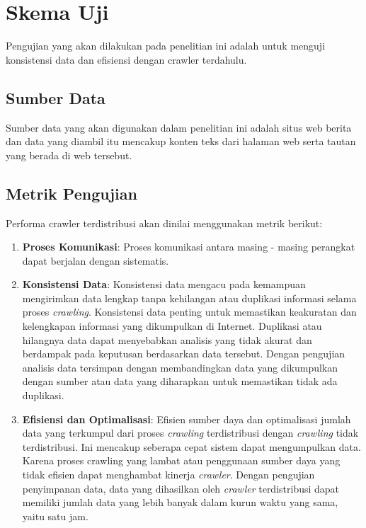 \section{Skema Uji}

Pengujian yang akan dilakukan pada penelitian ini adalah untuk menguji konsistensi data dan efisiensi dengan crawler terdahulu.

\subsection{Sumber Data}

Sumber data yang akan digunakan dalam penelitian ini adalah situs web berita dan data yang diambil itu mencakup konten teks dari halaman web serta tautan yang berada di web tersebut.

\subsection{Metrik Pengujian}

Performa crawler terdistribusi akan dinilai menggunakan metrik berikut:
\begin{enumerate}
  \item{\textbf{Proses Komunikasi}: Proses komunikasi antara masing - masing perangkat dapat berjalan dengan sistematis.}

  \item{\textbf{Konsistensi Data}: Konsistensi data mengacu pada kemampuan mengirimkan data lengkap tanpa kehilangan atau duplikasi informasi  selama proses \emph{crawling}. Konsistensi data penting untuk memastikan keakuratan dan kelengkapan informasi yang dikumpulkan di Internet. Duplikasi atau hilangnya data dapat menyebabkan analisis yang tidak akurat dan berdampak pada keputusan berdasarkan data tersebut. Dengan pengujian analisis data tersimpan dengan membandingkan data yang dikumpulkan dengan sumber atau data yang diharapkan untuk memastikan tidak ada duplikasi.}
    
  \item{\textbf{Efisiensi dan Optimalisasi}: Efisien sumber daya dan optimalisasi jumlah data yang terkumpul dari proses \emph{crawling} terdistribusi dengan \emph{crawling} tidak terdistribusi. Ini mencakup seberapa cepat sistem dapat mengumpulkan data. Karena proses crawling yang lambat atau penggunaan sumber daya yang tidak efisien dapat menghambat kinerja \emph{crawler}. Dengan pengujian penyimpanan data, data yang dihasilkan oleh \emph{crawler} terdistribusi dapat memiliki jumlah data yang lebih banyak dalam kurun waktu yang sama, yaitu satu jam.}
\end{enumerate}

